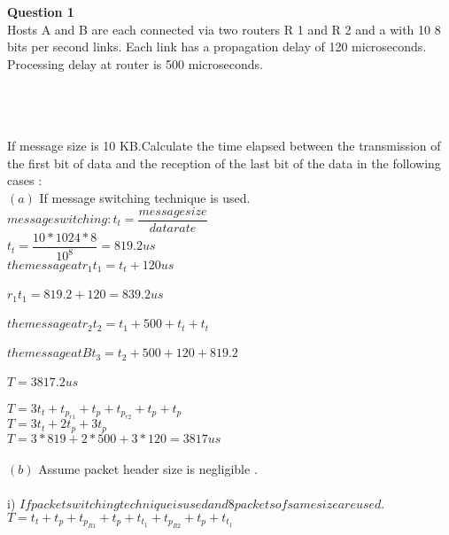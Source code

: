 \documentclass[a4paper,12pt]{article}
\begin{document}
\newpage
\textbf{Question 1}\\Hosts A and B are each connected via two routers R 1 and R 2 and a with 10 8 bits per
second links. Each link has a propagation delay of 120 microseconds. Processing delay at
router is 500 microseconds.\\\\
\\\\
If message size is 10 KB.Calculate the time elapsed between the transmission of the first
bit of data and the reception of the last bit of the data in the following cases :\\

$ (a) $ If message switching technique is used.\\

$ message switching: t_{t}=\dfrac{message size}{data rate}$\\ 
$ t_{t}=\dfrac{10*1024*8}{10^{8}}=819.2us$\\

$ the message at r_{1} t_{1}=t_{t}+120us$\\\\
$ r_{1} t_{1}=819.2+120=839.2us$\\\\
$ the message at r_{2} t_{2}=t_{1}+500 + t_{t} +t_{t}$\\\\
$ the message at B t_{3}=t_{2} + 500 + 120 + 819.2$\\\\
$ T =3817.2 us $\\\\
 
$ T = 3t_{t} + t_{p_{r1}} + t_{p} + t_{p_{r2}} + t_{p} + t_{p}$\\
$ T = 3t_{t} + 2t_{p} + 3t_{p} $\\
$ T = 3*819+2*500+3*120=3817 us $\\\\

$ (b) $ Assume packet header size is negligible .\\\\
i) $ If packet switching technique is used and 8 packets of same size are used.$\\
$ T = t_{t}+t_{p}+t_{p_{R1}}+t_{p}+t_{t_{1}}+t_{p_{R2}}+t_{p}+t_{t_{1}} $\\
\end{document}
